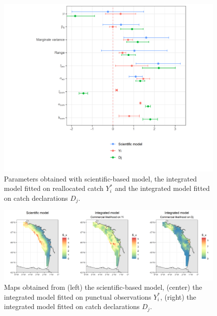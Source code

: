 \documentclass[
  english,
  man]{apa6}
\begin{document}
\begin{figure}
\centering
\includegraphics{images/par_plot.png}
\caption{\label{fig:CaseStudyPar} Parameters obtained with scientific-based model, the integrated model fitted on reallocated catch \(Y_i^*\) and the integrated model fitted on catch declarations \(D_j\).}
\end{figure}

\begin{figure}
\centering
\includegraphics{images/case_study_plot.png}
\caption{\label{fig:CaseStudyMap} Maps obtained from (left) the scientific-based model, (center) the integrated model fitted on punctual observations \(Y_i^*\), (right) the integrated model fitted on catch declarations \(D_j\).}
\end{figure}
\end{document}
